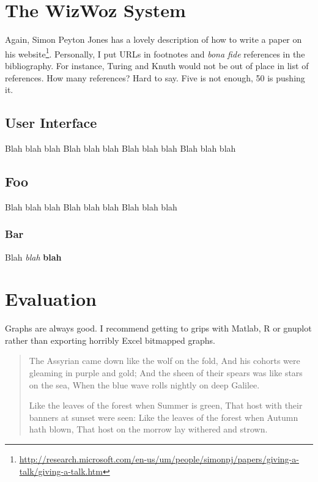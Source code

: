 \documentclass{mpaper}
\begin{document}
\section{The WizWoz System}

Again, Simon Peyton Jones has a lovely description of how to write a
paper on his
website\footnote{\url{http://research.microsoft.com/en-us/um/people/simonpj/papers/giving-a-talk/giving-a-talk.htm}}.
Personally, I put URLs in footnotes and \emph{bona fide} references
in the bibliography. For instance, Turing \cite{turing37computable}
and Knuth \cite{knuth68art} would not be out of place in list of
references.
How many references? Hard to say. Five is not enough, 50 is pushing
it.

\subsection{User Interface}

Blah blah blah
Blah blah blah
Blah blah blah
Blah blah blah

\subsection{Foo}

Blah blah blah
Blah blah blah
Blah blah blah

\subsubsection{Bar}
\textsf{Blah} \textit{blah} \textbf{blah}

\section{Evaluation}

Graphs are always good. I recommend getting to grips with Matlab, R or
gnuplot rather than exporting horribly Excel bitmapped graphs.


\begin{quotation}
 The Assyrian came down like the wolf on the fold,
 And his cohorts were gleaming in purple and gold;
 And the sheen of their spears was like stars on the sea,
 When the blue wave rolls nightly on deep Galilee.

 Like the leaves of the forest when Summer is green,
 That host with their banners at sunset were seen:
 Like the leaves of the forest when Autumn hath blown,
 That host on the morrow lay withered and strown.
\end{quotation}
\end{document}
